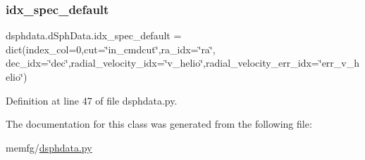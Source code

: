 \subsubsection{\texorpdfstring{idx\+\_\+spec\+\_\+default}{idx\_spec\_default}}
{\footnotesize\ttfamily dsphdata.\+d\+Sph\+Data.\+idx\+\_\+spec\+\_\+default = dict(index\+\_\+col=0,cut=\char`\"{}in\+\_\+cmdcut\char`\"{},ra\+\_\+idx=\char`\"{}ra\char`\"{}, dec\+\_\+idx=\char`\"{}dec\char`\"{},radial\+\_\+velocity\+\_\+idx=\char`\"{}v\+\_\+helio\char`\"{},radial\+\_\+velocity\+\_\+err\+\_\+idx=\char`\"{}err\+\_\+v\+\_\+helio\char`\"{})\hspace{0.3cm}{\ttfamily [static]}}



Definition at line 47 of file dsphdata.\+py.



The documentation for this class was generated from the following file\+:\begin{DoxyCompactItemize}
\item 
memfg/\hyperlink{dsphdata_8py}{dsphdata.\+py}\end{DoxyCompactItemize}
